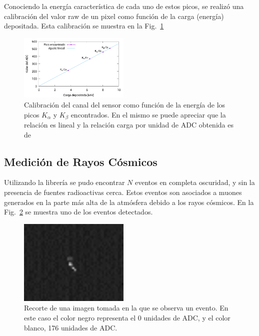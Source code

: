 \documentclass[twoside,twocolumn]{article}
\begin{document}
      Conociendo la energía característica de cada uno de estos picos, %
      se realizó una calibración del valor raw de un pixel como función de la carga (energía) depositada.
      Esta calibración se muestra en la Fig.~\ref{fig:x-ray_calibration}

      \begin{figure}[h]
        \includegraphics[width=0.47\textwidth]{figures/x-ray_calibration} %
        \caption{Calibración del canal del sensor como función de la energía de los picos $K_{\alpha}$ y $K_{\beta}$ encontrados.
          En el mismo se puede apreciar que la relación es lineal y la relación carga por unidad de ADC obtenida es de $ $ %
        }
        \label{fig:x-ray_calibration}
      \end{figure}

    \subsection{Medición de Rayos Cósmicos}\label{sec:results:cosmic_ray}
      Utilizando la librería se pudo encontrar $N$ %
      eventos en completa oscuridad, y sin la presencia de fuentes radioactivas cerca.
      Estos eventos son asociados a muones generados en la parte más alta de la atmósfera debido a los rayos cósmicos.
      En la Fig.~\ref{fig:cosmic_ray} se muestra uno de los eventos detectados.

      \begin{figure}[h]
        \includegraphics[width=0.47\textwidth]{figures/06-04-18_09-27-42.pdf} %
        \caption{Recorte de una imagen tomada en la que se observa un evento.
        En este caso el color negro representa el 0 unidades de ADC, y el color blanco, 176 unidades de ADC.
        } %
        \label{fig:cosmic_ray}
      \end{figure}
\end{document}
